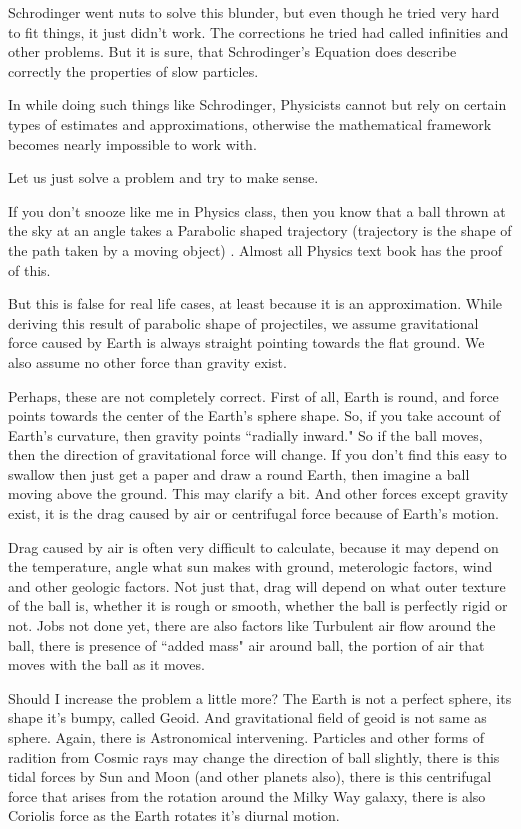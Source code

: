 \documentclass[12pt,a4paper,darkblue]{memoir}
\begin{document}
Schrodinger went nuts to solve this blunder, but even though he tried very hard to fit things, it just didn't work. The corrections he tried had called infinities and other problems. But it is sure, that Schrodinger's Equation does describe correctly the properties of slow particles. 

In while doing such things like Schrodinger, Physicists cannot but rely on certain types of estimates and approximations, otherwise the mathematical framework becomes nearly impossible to work with. 

Let us just solve a problem and try to make sense. 

If you don't snooze like me in Physics class, then you know that a ball thrown at the sky at an angle takes a Parabolic shaped trajectory (trajectory is the shape of the path taken by a moving object) . Almost all Physics text book has the proof of this.

But this is false for real life cases, at least because it is an approximation. While deriving this result of parabolic shape of projectiles, we assume gravitational force caused by Earth is always straight pointing towards the flat ground. We also assume no other force than gravity exist.

Perhaps, these are not completely correct. First of all, Earth is round, and force points towards the center of the Earth's sphere shape. So, if you take account of Earth's curvature, then gravity points ``radially inward." So if the ball moves, then the direction of gravitational force will change. If you don't find this easy to swallow then just get a paper and draw a round Earth, then imagine a ball moving above the ground. This may clarify a bit. And other forces except gravity exist, it is the drag caused by air or centrifugal force because of Earth's motion. 

Drag caused by air is often very difficult to calculate, because it may depend on the temperature, angle what sun makes with ground, meterologic factors, wind and other geologic factors. Not just that, drag will depend on what outer texture of the ball is, whether it is rough or smooth, whether the ball is perfectly rigid or not. Jobs not done yet, there are also factors like Turbulent air flow around the ball, there is presence of ``added mass" air around ball, the portion of air that moves with the ball as it moves. 

Should I increase the problem a little more? The Earth is not a perfect sphere, its shape it's bumpy, called Geoid. And gravitational field of geoid is not same as sphere. Again, there is Astronomical intervening. Particles and other forms of radition from Cosmic rays may change the direction of ball slightly, there is this tidal forces by Sun and Moon (and other planets also), there is this centrifugal force that arises from the rotation around the Milky Way galaxy, there is also Coriolis force as the Earth rotates it's diurnal motion.
\end{document}
